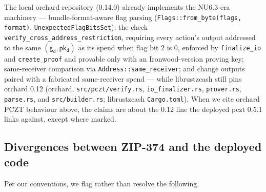 \documentclass[11pt,a4paper]{article}
\theoremstyle{definition}
\newcommand{\pkd}{\ensuremath{\mathsf{pk_d}}}
\newcommand{\gd}{\ensuremath{\mathsf{g_d}}}
\begin{document}
The local \textsf{orchard} repository (0.14.0) already implements the
NU6.3-era machinery --- bundle-format-aware flag parsing
(\texttt{Flags::from\_byte(flags, format)},
\texttt{UnexpectedFlagBitsSet}); the check
\texttt{verify\_cross\_address\_restriction}, requiring every action's
output addressed to the same
$(\gd, \pkd)$ as its spend when flag bit $2$ is $0$, enforced by
\texttt{finalize\_io} and \texttt{create\_proof} and provable only with
an Ironwood-version proving key; same-receiver comparison via
\texttt{Address::same\_receiver}; and change outputs paired with a
fabricated same-receiver spend --- while librustzcash still pins
\textsf{orchard} 0.12 (\textsf{orchard}, \texttt{src/pczt/verify.rs},
\texttt{io\_finalizer.rs}, \texttt{prover.rs}, \texttt{parse.rs}, and
\texttt{src/builder.rs}; librustzcash \texttt{Cargo.toml}). When we cite
\textsf{orchard} PCZT behaviour above, the claims are about the 0.12 line
the deployed \textsf{pczt} 0.5.1 links against, except where marked.

\subsection{Divergences between ZIP-374 and the deployed code}%
\label{sec:pczt-divergences}

Per our conventions, we flag rather than resolve the following.
\end{document}
